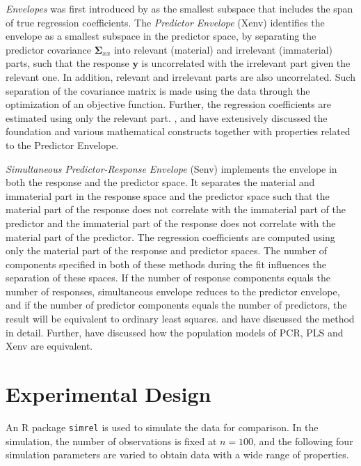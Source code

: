 \documentclass[12pt,3p,authoryear]{elsarticle}
\begin{document}
\emph{Envelopes} was first introduced by \citep{Cook2007a} as the smallest subspace that includes the span of true regression coefficients. The \emph{Predictor Envelope} (Xenv) identifies the envelope as a smallest subspace in the predictor space, by separating the predictor covariance \(\boldsymbol{\Sigma}_{xx}\) into relevant (material) and irrelevant (immaterial) parts, such that the response \(\mathbf{y}\) is uncorrelated with the irrelevant part given the relevant one. In addition, relevant and irrelevant parts are also uncorrelated. Such separation of the covariance matrix is made using the data through the optimization of an objective function. Further, the regression coefficients are estimated using only the relevant part. \citet{cook2010envelope}, \citet{cook2013envelopes} and \citet{cook2018envelope} have extensively discussed the foundation and various mathematical constructs together with properties related to the Predictor Envelope.

\emph{Simultaneous Predictor-Response Envelope} (Senv) implements the envelope in both the response and the predictor space. It separates the material and immaterial part in the response space and the predictor space such that the material part of the response does not correlate with the immaterial part of the predictor and the immaterial part of the response does not correlate with the material part of the predictor. The regression coefficients are computed using only the material part of the response and predictor spaces. The number of components specified in both of these methods during the fit influences the separation of these spaces. If the number of response components equals the number of responses, simultaneous envelope reduces to the predictor envelope, and if the number of predictor components equals the number of predictors, the result will be equivalent to ordinary least squares. \citet{cook2015simultaneous} and \citet{cook2018envelope} have discussed the method in detail. Further, \citet{helland2016algorithms} have discussed how the population models of PCR, PLS and Xenv are equivalent.

\hypertarget{experimental-design}{%
\section{Experimental Design}\label{experimental-design}}

An R \citep{coreR2018} package \texttt{simrel} \citep{Rimal2018, saebo2015simrel} is used to simulate the data for comparison. In the simulation, the number of observations is fixed at \(n = 100\), and the following four simulation parameters are varied to obtain data with a wide range of properties.
\end{document}

